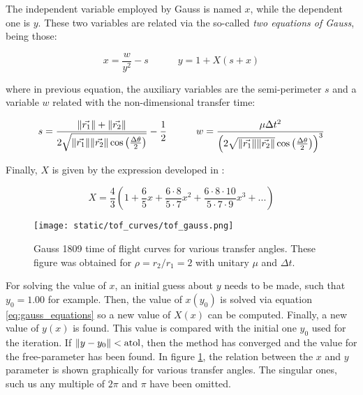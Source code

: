 The independent variable employed by Gauss is named $x$, while the dependent one
is $y$. These two variables are related via the so-called \textit{two equations
of Gauss}, being those:

\begin{equation}
x = \frac{w}{y^2} - s\quad\quad\quad
y = 1 + X(s + x)
\label{eq:gauss_equations}
\end{equation}

where in previous equation, the auxiliary variables are the semi-perimeter $s$
and a variable $w$ related with the non-dimensional transfer time:

\begin{equation}
s = \frac{\lVert\vec{r_1}\rVert + \lVert\vec{r_2}\rVert}{2 \sqrt{\lVert\vec{r_1}\rVert\lVert\vec{r_2}\rVert \cos{\left(\frac{\Delta \theta}{2} \right)}}} - \frac{1}{2}\quad\quad\quad
w = \frac{\mu \Delta t^2}{\left(2\sqrt{\lVert\vec{r_1}\rVert \lVert\vec{r_2}\rVert} \cos{\left(\frac{\Delta \theta}{2} \right)}\right)^3}
\end{equation}

Finally, $X$ is given by the expression developed in \cite{moulton1970}:

\begin{equation}
X = \frac{4}{3}\left(1 + \frac{6}{5}x + \frac{6 \cdot 8}{5 \cdot 7}x^2 + \frac{6 \cdot 8 \cdot 10}{5 \cdot 7 \cdot 9}x^3 + ...\right)
\end{equation}

\vspace{0.5cm}
\begin{figure}[h]
  \centering
  \texttt{[image: static/tof\_curves/tof\_gauss.png]}
  \caption{Gauss 1809 time of flight curves for various transfer angles. These
  figure was obtained for $\rho=r_2/r_1=2$ with unitary $\mu$ and $\Delta t$.}
    \label{fig:tof_gauss}
\end{figure}

For solving the value of $x$, an initial guess about $y$ needs to be made, such
that $y_0=1.00$ for example. Then, the value of $x(y_0)$ is solved via equation
\ref{eq:gauss_equations} so a new value of $X(x)$ can be computed. Finally, a new
value of $y(x)$ is found. This value is compared with the initial one $y_0$ used
for the iteration. If $\lVert y - y_0\rVert < \text{atol}$, then the method has
converged and the value for the free-parameter has been found. In figure
\ref{fig:tof_gauss}, the relation between the $x$ and $y$ parameter is shown
graphically for various transfer angles. The singular ones, such us any multiple
of $2\pi$ and $\pi$ have been omitted.

